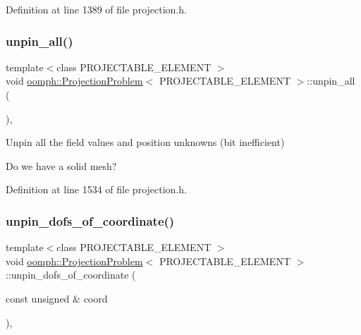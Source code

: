 Definition at line 1389 of file projection.\+h.

\mbox{\label{classoomph_1_1ProjectionProblem_ac0b06207d156be752a3fccfab654826e}} 
\subsubsection{\texorpdfstring{unpin\+\_\+all()}{unpin\_all()}}
{\footnotesize\ttfamily template$<$class P\+R\+O\+J\+E\+C\+T\+A\+B\+L\+E\+\_\+\+E\+L\+E\+M\+E\+NT $>$ \\
void \hyperlink{classoomph_1_1ProjectionProblem}{oomph\+::\+Projection\+Problem}$<$ P\+R\+O\+J\+E\+C\+T\+A\+B\+L\+E\+\_\+\+E\+L\+E\+M\+E\+NT $>$\+::unpin\+\_\+all (\begin{DoxyParamCaption}{ }\end{DoxyParamCaption})\hspace{0.3cm}{\ttfamily [inline]}, {\ttfamily [private]}}



Unpin all the field values and position unknowns (bit inefficient) 

Do we have a solid mesh? 

Definition at line 1534 of file projection.\+h.

\mbox{\label{classoomph_1_1ProjectionProblem_a50b3643c4e6942755e1ede1c0ab417ec}} 
\subsubsection{\texorpdfstring{unpin\+\_\+dofs\+\_\+of\+\_\+coordinate()}{unpin\_dofs\_of\_coordinate()}}
{\footnotesize\ttfamily template$<$class P\+R\+O\+J\+E\+C\+T\+A\+B\+L\+E\+\_\+\+E\+L\+E\+M\+E\+NT $>$ \\
void \hyperlink{classoomph_1_1ProjectionProblem}{oomph\+::\+Projection\+Problem}$<$ P\+R\+O\+J\+E\+C\+T\+A\+B\+L\+E\+\_\+\+E\+L\+E\+M\+E\+NT $>$\+::unpin\+\_\+dofs\+\_\+of\+\_\+coordinate (\begin{DoxyParamCaption}\item[{const unsigned \&}]{coord }\end{DoxyParamCaption})\hspace{0.3cm}{\ttfamily [inline]}, {\ttfamily [private]}}




